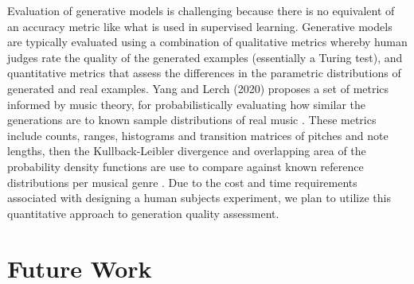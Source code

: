 \documentclass[sigconf,authorversion]{acmart}
\begin{document}
Evaluation of generative models is challenging because there is no equivalent of
an accuracy metric like what is used in supervised learning. Generative models
are typically evaluated using a combination of qualitative metrics whereby human
judges rate the quality of the generated examples (essentially a Turing test),
and quantitative metrics that assess the differences in the parametric
distributions of generated and real examples. Yang and Lerch (2020) proposes a
set of metrics informed by music theory, for probabilistically evaluating how
similar the generations are to known sample distributions of real music
\cite{yang_evaluation_2020}. These metrics include counts, ranges, histograms
and transition matrices of pitches and note lengths, then the Kullback-Leibler
divergence and overlapping area of the probability density functions are use to
compare against known reference distributions per musical genre
\cite{yang_evaluation_2020}. Due to the cost and time requirements associated
with designing a human subjects experiment, we plan to utilize this quantitative
approach to generation quality assessment.

\section{Future Work}



\end{document}
